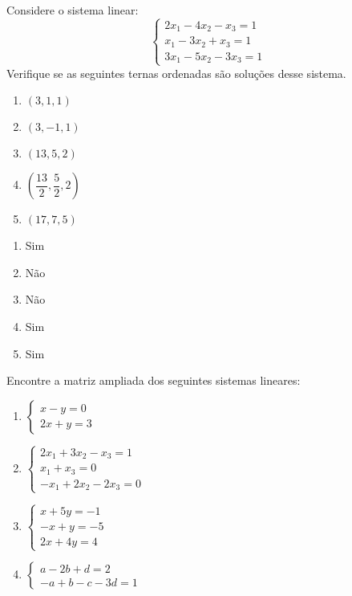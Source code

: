 \documentclass[12pt]{exam}
\begin{document}
\begin{exercicio}
  Considere o sistema linear:
  \[
    \begin{cases}
      2x_1 - 4x_2 - x_3 = 1\\
      x_1 - 3x_2 + x_3 = 1\\
      3x_1 - 5x_2 - 3x_3 = 1
    \end{cases}
  \]
  Verifique se as seguintes ternas ordenadas são soluções desse sistema.
  \begin{enumerate}
    \item $(3,1,1)$
    \item $(3,-1,1)$
    \item $(13, 5, 2)$
    \item $\left(\dfrac{13}{2}, \dfrac{5}{2}, 2\right)$
    \item $(17,7,5)$
  \end{enumerate}
  \begin{solucao}
    \begin{enumerate}
      \item Sim
      \item Não
      \item Não
      \item Sim
      \item Sim
    \end{enumerate}
  \end{solucao}
\end{exercicio}

\begin{exercicio}
  Encontre a matriz ampliada dos seguintes sistemas lineares:
  \begin{enumerate}
    \item $\begin{cases}x - y = 0\\2x + y = 3\end{cases}$
    \item $\begin{cases}2x_1 + 3x_2 - x_3 = 1\\x_1 + x_3 = 0\\-x_1 + 2x_2 - 2x_3 = 0\end{cases}$
    \item $\begin{cases}x + 5y = -1\\-x + y = -5\\2x + 4y = 4\end{cases}$
    \item $\begin{cases}a - 2b + d = 2\\-a + b - c - 3d = 1\end{cases}$
  \end{enumerate}
\end{exercicio}
\end{document}
